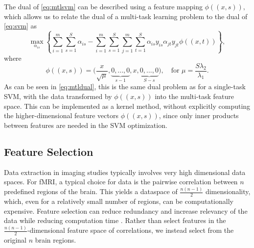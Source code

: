\documentclass{llncs}
\begin{document}
The dual of \eqref{eq:mtlsvm} can be described using a feature mapping
$\phi((x,s)),$ which allows us to relate the dual of a multi-task learning
problem to the dual of \eqref{eq:svm} as
\begin{equation}
\label{eq:mtldual}
\max_{\alpha_{is}}  \left\{ \sum_{i=1}^m\sum_{s=1}^S \alpha_{is} -  \sum_{i=1}^m\sum_{s=1}^S\sum_{j=1}^m\sum_{t=1}^S  \alpha_{is}y_{is}\alpha_{jt}y_{jt}\phi((x,t))      \right\},
\end{equation}
where
\begin{equation}
\phi((x,s)) = \Big(\frac{x}{\sqrt{\mu}}, \underbrace{0,...,0}_{s-1}, x,
\underbrace{0,...,0}_{S-s} \Big), \quad \text{for  } \mu = \frac{S \lambda_2}{\lambda_1} .
\end{equation}
As can be seen in \eqref{eq:mtldual}, this is the same dual problem as for a
single-task SVM, with the data transformed by $\phi((x,s))$ into the multi-task
feature space. This can be implemented as a kernel method, without explicitly
computing the higher-dimensional feature vectors $\phi((x,s))$, since only inner
products between features are needed in the SVM optimization.




\subsection{Feature Selection}
\label{subsec:FS}
Data extraction in imaging studies typically involves very high dimensional data
spaces.  For fMRI, a typical choice for data is the pairwise correlation between
$n$ predefined regions of the brain.  This yields a dataspace of
$\frac{n(n-1)}{2}$ dimensionality, which, even for a relatively small number of
regions, can be computationally expensive.  Feature selection can reduce
redundancy and increase relevancy of the data while reducing computation time
\cite{featsel}. Rather than select features in the
$\frac{n(n-1)}{2}$-dimensional feature space of correlations, we instead select
from the original $n$ brain regions.
\end{document}

